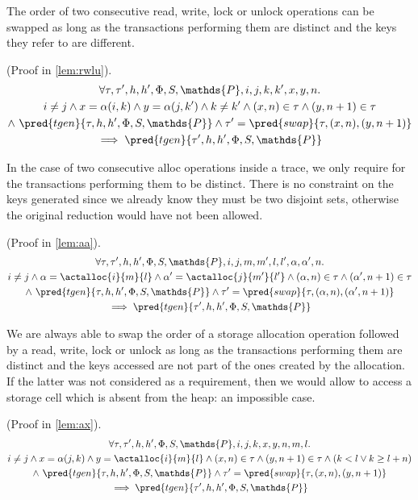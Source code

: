 The order of two consecutive read, write, lock or unlock operations can be swapped as long as the transactions performing them are distinct and the keys they refer to are different.
\begin{lem}
	(Proof in \ref{lem:rwlu}).
	\begin{gather*}
		\forall \tau, \tau', h, h', \Phi, S, \mathds{P}, i, j, k, k', x, y, n \ldotp \\
			i \neq j \land x = \alpha(i, k) \land y = \alpha(j, k') \land k \neq k' \land (x, n) \in \tau \land (y, n+1) \in \tau \\ \land\ \pred{tgen}{\tau, h, h', \Phi, S, \mathds{P}} \land \tau' = \pred{swap}{\tau, (x, n), (y, n+1)}
			\\	 
		 \implies \pred{tgen}{\tau', h, h', \Phi, S, \mathds{P}}
	\end{gather*}
\end{lem}

In the case of two consecutive alloc operations inside a trace, we only require for the transactions performing them to be distinct. There is no constraint on the keys generated since we already know they must be two disjoint sets, otherwise the original reduction would have not been allowed.
\begin{lem}
	(Proof in \ref{lem:aa}).
	\begin{gather*}
		\forall \tau, \tau', h, h', \Phi, S, \mathds{P}, i, j, m, m', l, l', \alpha, \alpha', n \ldotp \\
			i \neq j \land \alpha = \actalloc{i}{m}{l} \land \alpha' = \actalloc{j}{m'}{l'} \land (\alpha, n) \in \tau \land (\alpha', n+1) \in \tau \\ \land\ \pred{tgen}{\tau, h, h', \Phi, S, \mathds{P}} \land \tau' = \pred{swap}{\tau, (\alpha, n), (\alpha', n+1)}
			\\	 
		 \implies \pred{tgen}{\tau', h, h', \Phi, S, \mathds{P}}
	\end{gather*}
\end{lem}

We are always able to swap the order of a storage allocation operation followed by a read, write, lock or unlock as long as the transactions performing them are distinct and the keys accessed are not part of the ones created by the allocation. If the latter was not considered as a requirement, then we would allow to access a storage cell which is absent from the heap: an impossible case.
\begin{lem}
	(Proof in \ref{lem:ax}).
	\begin{gather*}
		\forall \tau, \tau', h, h', \Phi, S, \mathds{P}, i, j, k, x, y, n, m, l \ldotp \\
			i \neq j \land x = \alpha(j, k) \land y = \actalloc{i}{m}{l} \land (x, n) \in \tau \land (y, n+1) \in \tau \land (k < l \lor k \geq l + n) \\ \land\ \pred{tgen}{\tau, h, h', \Phi, S, \mathds{P}} \land \tau' = \pred{swap}{\tau, (x, n), (y, n+1)}
			\\	 
		 \implies \pred{tgen}{\tau', h, h', \Phi, S, \mathds{P}}
	\end{gather*}
\end{lem}

